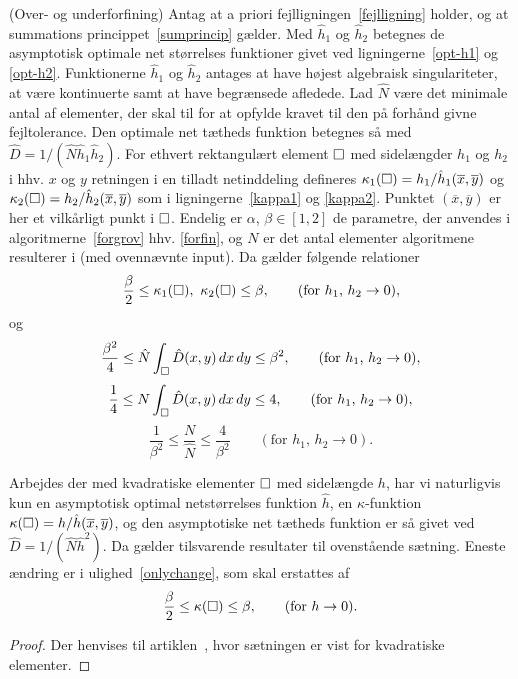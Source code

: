 \begin{theorem}{(Over- og underforfining)} \label{theoryalg}
Antag at a priori fejlligningen~\eqref{fejlligning} holder, og at summations
princippet~\eqref{sumprincip} gælder. Med $\hat{h}_1$ og $\hat{h}_2$ betegnes de
asymptotisk optimale net størrelses funktioner givet ved
ligningerne~\eqref{opt-h1} og \eqref{opt-h2}. Funktionerne $\hat{h}_1$
og $\hat{h}_2$ antages at have højest algebraisk singulariteter, at
være kontinuerte samt at have begrænsede afledede. Lad $\hat{N}$ være
det minimale antal af elementer, der skal til for at opfylde kravet
til den på forhånd givne fejltolerance. Den optimale net tætheds
funktion betegnes så med $\hat{D}=1/(\hat{N}\hat{h}_1\hat{h}_2)$. For
ethvert rektangulært element $\Box$ med sidelængder $h_1$ og $h_2$ i
hhv. $x$ og $y$ retningen i en tilladt netinddeling defineres
$\kappa_1(\Box)=h_1/\hat{h}_1(\overline{x},\overline{y})$ og
$\kappa_2(\Box)=h_2/\hat{h}_2(\overline{x},\overline{y})$ som i
ligningerne~\eqref{kappa1} og \eqref{kappa2}. Punktet
$(\overline{x},\overline{y})$ er her et vilkårligt punkt i $\Box$.
Endelig er $\alpha$, $\beta\in [1,2]$ de parametre, der anvendes i
algoritmerne~\eqref{forgrov} hhv. \eqref{forfin}, og $N$ er det antal
elementer algoritmene resulterer i (med ovennævnte input). Da gælder
følgende relationer 
\begin{equation} \label{onlychange}
  \frac{\beta}{2} \leq \kappa_1(\Box), \ \kappa_2(\Box) \leq \beta ,
  \qquad (\text{for $h_1$, $h_2\rightarrow 0$}),
\end{equation}
og
\begin{equation}
  \frac{\beta^2}{4} \leq \hat{N} \int_\Box \hat{D}(x,y)\, dx\, dy
  \leq \beta^2 , \qquad (\text{for $h_1$, $h_2\rightarrow 0$}),
\end{equation}
\begin{equation}
  \frac{1}{4} \leq N \int_\Box \hat{D}(x,y)\, dx\, dy \leq 4 ,  
  \qquad (\text{for $h_1$, $h_2\rightarrow 0$}),
\end{equation}
\begin{equation}
  \frac{1}{\beta^2} \leq \frac{N}{\hat{N}} \leq \frac{4}{\beta^2}
  \qquad (\text{for $h_1$, $h_2\rightarrow 0$}).
\end{equation}
\end{theorem}
\begin{remark}
Arbejdes der med kvadratiske elementer $\Box$ med sidelængde $h$, har
vi naturligvis kun en asymptotisk optimal netstørrelses funktion
$\hat{h}$, en $\kappa$-funktion
$\kappa(\Box)=h/\hat{h}(\overline{x},\overline{y})$, og den
asymptotiske net tætheds funktion er så givet ved
$\hat{D}=1/(\hat{N}\hat{h}^2)$. Da gælder tilsvarende resultater til
ovenstående sætning.
Eneste ændring er i ulighed~\eqref{onlychange}, som skal erstattes af 
\begin{equation}
  \frac{\beta}{2} \leq \kappa(\Box) \leq \beta ,
  \qquad (\text{for $h\rightarrow 0$}).
\end{equation} 
\end{remark}
\begin{proof}
Der henvises til artiklen~\cite{hugger-2}, hvor sætningen er vist for
kvadratiske elementer.
\end{proof}

